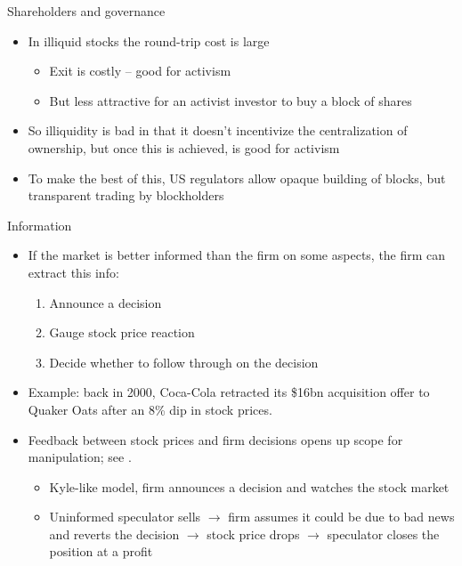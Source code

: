 \documentclass[english,10pt
,aspectratio=169
]{beamer}
\begin{document}
\begin{frame}{Shareholders and governance}
	\begin{itemize}
		\item In illiquid stocks the round-trip cost is large
		\begin{itemize}
			\item Exit is costly -- good for activism
			\item But less attractive for an activist investor to buy a block of shares
		\end{itemize}
		\item So illiquidity is bad in that it doesn't incentivize the centralization of ownership, but once this is achieved, is good for activism
		\item To make the best of this, US regulators allow opaque building of blocks, but transparent trading by blockholders
	\end{itemize}
\end{frame}


\begin{frame}{Information}
	\begin{itemize}
		\item If the market is better informed than the firm on some aspects, the firm can extract this info:
		\begin{enumerate}
			\item Announce a decision
			\item Gauge stock price reaction
			\item Decide whether to follow through on the decision
		\end{enumerate}
		\pause[3]
		\item Example: back in 2000, Coca-Cola retracted its \$16bn acquisition offer to Quaker Oats after an 8\% dip in stock prices.
		\item Feedback between stock prices and firm decisions opens up scope for manipulation; see \cite{goldstein_manipulation_2008}.
		\begin{itemize}
			\item Kyle-like model, firm announces a decision and watches the stock market
			\item Uninformed speculator sells $\to$ firm assumes it could be due to bad news and reverts the decision $\to$ stock price drops $\to$ speculator closes the position at a profit
		\end{itemize}
	\end{itemize}
\end{frame}
\end{document}
